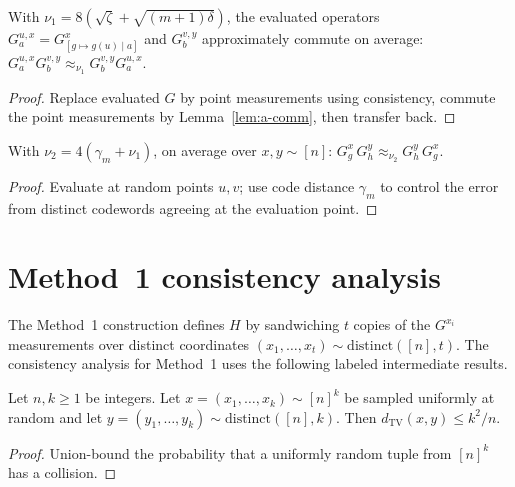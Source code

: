 \begin{lemma}\label{lem:g-comm-after-eval}
  With $\nu_1=8(\sqrt\zeta+\sqrt{(m+1)\delta})$,
  the evaluated operators $G^{u,x}_a=G^x_{[g\mapsto g(u)\mid a]}$ and
  $G^{v,y}_b$ approximately commute on average:
  $G^{u,x}_a G^{v,y}_b\approx_{\nu_1} G^{v,y}_b G^{u,x}_a$.
\end{lemma}
\begin{proof}
  Replace evaluated $G$ by point measurements using consistency,
  commute the point measurements by Lemma~\ref{lem:a-comm},
  then transfer back.
\end{proof}

\begin{lemma}\label{lem:g-comm}
  With $\nu_2=4(\gamma_m+\nu_1)$, on average over $x,y\sim[n]$:
  $G^x_g\,G^y_h\approx_{\nu_2}G^y_h\,G^x_g$.
\end{lemma}
\begin{proof}
  Evaluate at random points $u,v$; use code distance $\gamma_m$ to control
  the error from distinct codewords agreeing at the evaluation point.
\end{proof}

\section{Method~1 consistency analysis}

The Method~1 construction defines $H$ by sandwiching $t$ copies of the
$G^{x_i}$ measurements over distinct coordinates
$(x_1,\dots,x_t)\sim\mathrm{distinct}([n],t)$.
The consistency analysis for Method~1 uses the following labeled intermediate
results.

\begin{proposition}
  \label{prop:ld-dnoteq}
  Let $n,k\ge 1$ be integers. Let $x=(x_1,\dots,x_k)\sim[n]^k$ be
  sampled uniformly at random and let $y=(y_1,\dots,y_k)\sim\mathrm{distinct}([n],k)$.
  Then $d_{\mathrm{TV}}(x,y)\le k^2/n$.
\end{proposition}
\begin{proof}
  Union-bound the probability that a uniformly random tuple from $[n]^k$ has
  a collision.
\end{proof}

